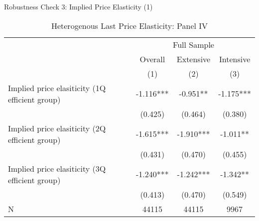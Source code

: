 \documentclass[
  ignorenonframetext,
]{beamer}
\begin{document}
\begin{frame}{Robustness Check 3: Implied Price Elasticity (1)}
\protect\hypertarget{robustness-check-3-implied-price-elasticity-1}{}
\begin{table}

\caption{\label{tab:kableHeteroShortElasticitySlide2}Heterogenous Last Price Elasticity: Panel IV}
\centering
\fontsize{8}{10}\selectfont
\begin{tabular}[t]{lccc}
\toprule
\multicolumn{1}{c}{ } & \multicolumn{3}{c}{Full Sample} \\
\cmidrule(l{3pt}r{3pt}){2-4}
\multicolumn{1}{c}{ } & \multicolumn{1}{c}{Overall} & \multicolumn{1}{c}{Extensive} & \multicolumn{1}{c}{Intensive} \\
\cmidrule(l{3pt}r{3pt}){2-2} \cmidrule(l{3pt}r{3pt}){3-3} \cmidrule(l{3pt}r{3pt}){4-4}
 & (1) & (2) & (3)\\
\midrule
Implied price elasiticity (1Q efficient group) & -1.116*** & -0.951** & -1.175***\\
 & (0.425) & (0.464) & (0.380)\\
Implied price elasiticity (2Q efficient group) & -1.615*** & -1.910*** & -1.011**\\
 & (0.431) & (0.470) & (0.455)\\
Implied price elasiticity (3Q efficient group) & -1.240*** & -1.242*** & -1.342**\\
 & (0.413) & (0.470) & (0.549)\\
N & 44115 & 44115 & 9967\\
\bottomrule
\end{tabular}
\end{table}
\end{frame}
\end{document}
